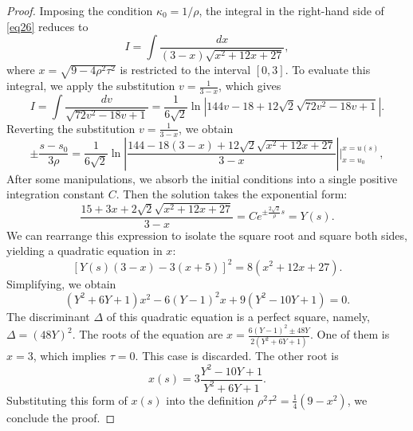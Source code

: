 \documentclass[a4paper,12pt]{amsart}
\theoremstyle{plain}
\theoremstyle{definition}
\begin{document}
\begin{proof}
Imposing the condition $\kappa_0 = 1/\rho$,   the integral in the right-hand side of \eqref{eq26} reduces to
\begin{equation*}
    I = \int \frac{dx}{(3-x)\sqrt{x^2 + 12x + 27}},
\end{equation*}
where $x=\sqrt{9-4\rho^2\tau^2}$ is restricted to the interval $[0,3]$. 
To evaluate this integral, we apply the   substitution $v = \frac{1}{3-x}$, which gives 
\begin{equation*}
    I = \int \frac{dv}{\sqrt{72v^2 - 18v + 1}} = \frac{1}{6\sqrt{2}} \ln \left| 144v - 18 + 12\sqrt{2}\sqrt{72v^2 - 18v + 1} \right|.
\end{equation*}
Reverting the substitution $v = \frac{1}{3-x}$, we obtain 
\begin{equation*}
    \pm \frac{s - s_0}{3\rho} = \frac{1}{6\sqrt{2}} \ln \left| \frac{144 - 18(3-x) + 12\sqrt{2}\sqrt{x^2+12x+27}}{3-x} \right| \Bigg|_{x=u_0}^{x=u(s)},
\end{equation*}
After some manipulations, we absorb the initial conditions into a single positive integration constant $C$. Then the 
solution takes the exponential form:
\begin{equation*}
       \frac{15 + 3x + 2\sqrt{2}\sqrt{x^2+12x+27}}{3-x}=C e^{\pm \frac{2\sqrt{2}}{\rho} s}=Y(s).
\end{equation*}
We can rearrange this expression to isolate the square root and square both sides, yielding a quadratic equation in $x$:
\begin{equation*}
    \left[ Y(s)(3-x) - 3(x+5) \right]^2 = 8(x^2 + 12x + 27).
\end{equation*} 
Simplifying, we obtain
\begin{equation*}
    (Y^2 + 6Y + 1)x^2 - 6(Y-1)^2 x + 9(Y^2 - 10Y + 1) = 0.
\end{equation*}
The discriminant $\Delta$ of this quadratic equation is  a perfect square, namely, $\Delta= (48Y)^2$. The roots of the equation are   $x = \frac{6(Y-1)^2 \pm 48Y}{2(Y^2 + 6Y + 1)}$. One of them is   $x = 3$,  which implies $\tau = 0$. This case is discarded. The other root is  
\begin{equation*}
    x(s) = 3 \frac{Y^2 - 10Y + 1}{Y^2 + 6Y + 1}.
\end{equation*}
Substituting this   form of $x(s)$ into the definition $\rho^2\tau^2 = \frac{1}{4}(9 - x^2)$, we conclude the proof.
\end{proof}
\end{document}
